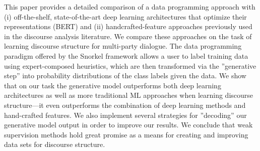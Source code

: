 This paper provides a detailed comparison of a data programming approach with (i) off-the-shelf, state-of-the-art deep learning architectures that optimize their representations (BERT) and (ii) handcrafted-feature approaches previously used in the discourse analysis literature. We compare these approaches on the task of learning discourse structure for multi-party dialogue. The data programming paradigm offered by the Snorkel framework allows a user to label training data using expert-composed heuristics, which are then transformed via the ''generative step'' into probability distributions of the class labels given the data. We show that on our task the generative model outperforms both deep learning architectures as well as more traditional ML approaches when learning discourse structure---it even outperforms the combination of deep learning methods and hand-crafted features. We also implement several strategies for ''decoding'' our generative model output in order to improve our results. We conclude that weak supervision methods hold great promise as a means for creating and improving data sets for discourse structure.